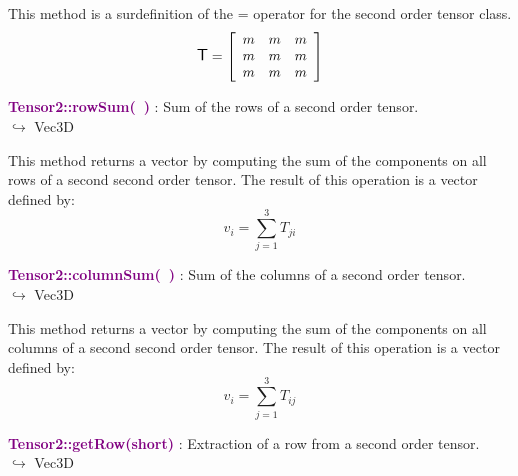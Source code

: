 This method is a surdefinition of the = operator for the second order tensor class.
\begin{equation*}
\mbox{\large\ensuremath{\mathsf{T}}}=\left[\begin{array}{ccc}
m&m&m\\
m&m&m\\
m&m&m
\end{array}\right]
\end{equation*}

\textcolor{purple}{\textbf{Tensor2::rowSum(~)}}\label{Tensor2::rowSum()} : Sum of the rows of a second order tensor.\\ \hspace*{5mm}$\hookrightarrow$ Vec3D

This method returns a vector by computing the sum of the components on all rows of a second second order tensor.
The result of this operation is a vector defined by:
\begin{equation*}
v_{i}=\sum_{j=1}^{3} T_{ji}
\end{equation*}

\textcolor{purple}{\textbf{Tensor2::columnSum(~)}}\label{Tensor2::columnSum()} : Sum of the columns of a second order tensor.\\ \hspace*{5mm}$\hookrightarrow$ Vec3D

This method returns a vector by computing the sum of the components on all columns of a second second order tensor.
The result of this operation is a vector defined by:
\begin{equation*}
v_{i}=\sum_{j=1}^{3}T_{ij}
\end{equation*}

\textcolor{purple}{\textbf{Tensor2::getRow(short)}}\label{Tensor2::getRow(short)} : Extraction of a row from a second order tensor.\\ \hspace*{5mm}$\hookrightarrow$ Vec3D

